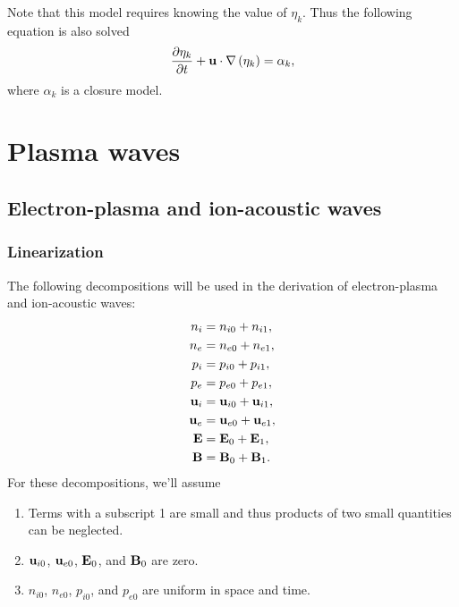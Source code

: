 \documentclass[a4paper,11pt]{report}
\begin{document}
Note that this model requires knowing the value of $\eta_k$. Thus the following equation is also solved
\begin{equation}
    \frac{\partial \eta_k}{\partial t} + \mathbf{u} \cdot \nabla \left( \eta_k \right) = \alpha_k,
\end{equation}
where $\alpha_k$ is a closure model.

\chapter{Plasma waves}

\section{Electron-plasma and ion-acoustic waves}

\subsection{Linearization}
\label{sec:p_waves_linearization}
The following decompositions will be used in the derivation of electron-plasma and ion-acoustic waves:
\begin{align}
    n_i &= n_{i0} + n_{i1}, \nonumber \\
    n_e &= n_{e0} + n_{e1}, \nonumber \\
    p_i &= p_{i0} + p_{i1}, \nonumber \\
    p_e &= p_{e0} + p_{e1}, \nonumber \\
    \mathbf{u}_i &= \mathbf{u}_{i0} + \mathbf{u}_{i1}, \nonumber \\
    \mathbf{u}_e &= \mathbf{u}_{e0} + \mathbf{u}_{e1}, \nonumber \\
    \mathbf{E} &= \mathbf{E}_0 + \mathbf{E}_1, \nonumber \\
    \mathbf{B} &= \mathbf{B}_0 + \mathbf{B}_1.
\end{align}
For these decompositions, we'll assume
\begin{enumerate}
    \item Terms with a subscript 1 are small and thus products of two small quantities can be neglected. \label{it:p_waves_assumption_1}
    \item $\mathbf{u}_{i0}$, $\mathbf{u}_{e0}$, $\mathbf{E}_0$, and $\mathbf{B}_0$ are zero. \label{it:p_waves_assumption_2}
    \item $n_{i0}$, $n_{e0}$, $p_{i0}$, and $p_{e0}$ are uniform in space and time. \label{it:p_waves_assumption_3}
\end{enumerate}
\end{document}
